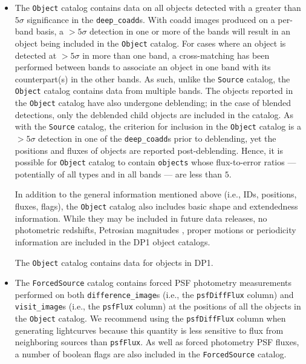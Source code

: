 \begin{itemize}
\item The \texttt{Object} catalog \citep{10.71929/rubin/2570325} contains data on all objects detected with a greater than $5\sigma$ significance in the \texttt{deep\_coadd}s.
With coadd images produced on a per-band basis, a $>5\sigma$ detection in one or more of the bands will result in an object being included in the \texttt{Object} catalog.
For cases where an object is detected at $>5\sigma$ in more than one band, a cross-matching has been performed between bands to associate an object in one band with its counterpart(s) in the other bands.
As such, unlike the \texttt{Source} catalog, the \texttt{Object} catalog contains data from multiple bands. 
The objects reported in the \texttt{Object} catalog have also undergone deblending; in the case of blended detections, only the deblended child objects are included in the catalog.
As with the \texttt{Source} catalog, the criterion for inclusion in the \texttt{Object} catalog is a $>5\sigma$ detection in one of the \texttt{deep\_coadd}s prior to deblending, yet the positions and fluxes of objects are reported post-deblending. 
Hence, it is possible for \texttt{Object} catalog to contain \texttt{objects} whose \gls{flux}-to-error ratios --- potentially of all types and in all bands --- are less than $5$.

In addition to the general information mentioned above (i.e., IDs, positions, fluxes, flags), the \texttt{Object} catalog also includes basic \gls{shape} and extendedness information.
While they may be included in future data releases, no photometric redshifts, Petrosian magnitudes \citep{1976ApJ...209L...1P}, proper motions or periodicity information are included in the \gls{DP1} object catalogs.

The \texttt{Object} catalog contains data for \nobjects objects in \gls{DP1}.


\item The \texttt{ForcedSource} catalog \citep{10.71929/rubin/2570327} contains forced \gls{PSF} photometry measurements performed on both \texttt{difference\_image}s (i.e., the \texttt{psfDiffFlux} column) and \texttt{visit\_image}s (i.e., the \texttt{psfFlux} column) at the positions of all the objects in the \texttt{Object} catalog.
We recommend using the \texttt{psfDiffFlux} column when generating lightcurves because this quantity is less sensitive to \gls{flux} from neighboring sources than \texttt{psfFlux}.
As well as \gls{forced photometry} \gls{PSF} fluxes, a number of boolean flags are also included in the \texttt{ForcedSource} catalog.


\end{itemize}
